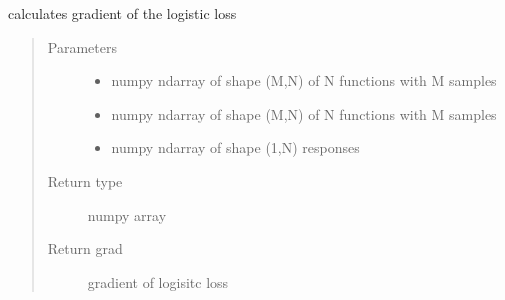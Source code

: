 \documentclass[letterpaper,10pt,english]{sphinxmanual}
\begin{document}

\begin{fulllineitems}
\label{\detokenize{regression:regression.logit_gradient}}
calculates gradient of the logistic loss
\begin{quote}\begin{description}
\item[{Parameters}] \leavevmode\begin{itemize}
\item {} 
 \textendash{} numpy ndarray of shape (M,N) of N functions with M samples

\item {} 
 \textendash{} numpy ndarray of shape (M,N) of N functions with M samples

\item {} 
 \textendash{} numpy ndarray of shape (1,N) responses

\end{itemize}

\item[{Return type}] \leavevmode
numpy array

\item[{Return grad}] \leavevmode
gradient of logisitc loss

\end{description}\end{quote}

\end{fulllineitems}

\end{document}
